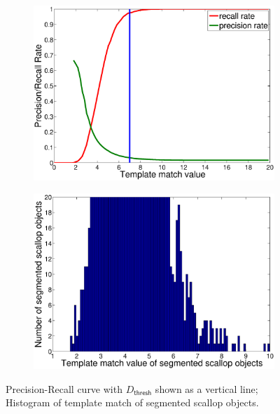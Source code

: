 \documentclass {udthesis}
\begin{document}
%
\begin{figure}
  \centering
  \begin{subfigure}{0.47\textwidth}
      \includegraphics[width=\textwidth]{precision_recall}
      \caption{}
      \label{subfig:precision_recall}
  \end{subfigure}
  \begin{subfigure}{0.47\textwidth}
      \includegraphics[width=\textwidth]{template_thresh_hist}         
      \caption{}
      \label{subfig:template_hist}
  \end{subfigure}
  \caption{ Precision-Recall curve with $D_\mathsf{thresh}$ shown as
  a vertical line;  
  Histogram of template match of segmented scallop objects.}
  \label{detection-curves}
\end{figure}
\end{document}
